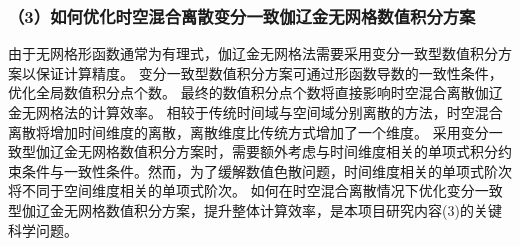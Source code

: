 \subsubsection*{\bfseries （3）如何优化时空混合离散变分一致伽辽金无网格数值积分方案}
由于无网格形函数通常为有理式，伽辽金无网格法需要采用变分一致型数值积分方案以保证计算精度。
变分一致型数值积分方案可通过形函数导数的一致性条件，优化全局数值积分点个数。
最终的数值积分点个数将直接影响时空混合离散伽辽金无网格法的计算效率。
相较于传统时间域与空间域分别离散的方法，时空混合离散将增加时间维度的离散，离散维度比传统方式增加了一个维度。
采用变分一致型伽辽金无网格数值积分方案时，需要额外考虑与时间维度相关的单项式积分约束条件与一致性条件。然而，为了缓解数值色散问题，时间维度相关的单项式阶次将不同于空间维度相关的单项式阶次。
如何在时空混合离散情况下优化变分一致型伽辽金无网格数值积分方案，提升整体计算效率，是本项目研究内容(3)的关键科学问题。